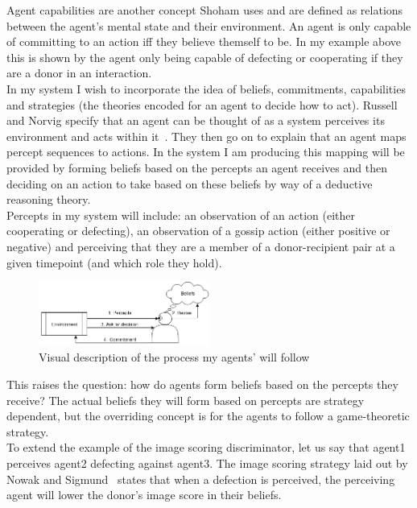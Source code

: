 \documentclass[twoside,twocolumn]{article}
\begin{document}
Agent capabilities are another concept Shoham uses and are defined as relations between the agent's mental state and their environment. An agent is only capable of committing to an action iff they believe themself to be. In my example above this is shown by the agent only being capable of defecting or cooperating if they are a donor in an interaction.\\
In my system I wish to incorporate the idea of beliefs, commitments, capabilities and strategies (the theories encoded for an agent to decide how to act). Russell and Norvig specify that an agent can be thought of as a system perceives its environment and acts within it~\cite{russell2016artificial}. They then go on to explain that an agent maps percept sequences to actions. In the system I am producing this mapping will be provided by forming beliefs based on the percepts an agent receives and then deciding on an action to take based on these beliefs by way of a deductive reasoning theory.\\
Percepts in my system will include: an observation of an action (either cooperating or defecting), an observation of a gossip action (either positive or negative) and perceiving that they are a member of a donor-recipient pair at a given timepoint (and which role they hold).\\
\begin{figure}
	\begin{center}
	\includegraphics[width=0.5\textwidth]{PerceiveReviseDecide.png}
	\caption{Visual description of the process my agents' will follow}
	\label{fig:percept_to_action}
	\end{center}
\end{figure}
\noindent This raises the question: how do agents form beliefs based on the percepts they receive? The actual beliefs they will form based on percepts are strategy dependent, but the overriding concept is for the agents to follow a game-theoretic strategy.\\
To extend the example of the image scoring discriminator, let us say that agent1 perceives agent2 defecting against agent3. The image scoring strategy laid out by Nowak and Sigmund~\cite{evol_indirect_image} states that when a defection is perceived, the perceiving agent will lower the donor's image score in their beliefs.\\
\end{document}
